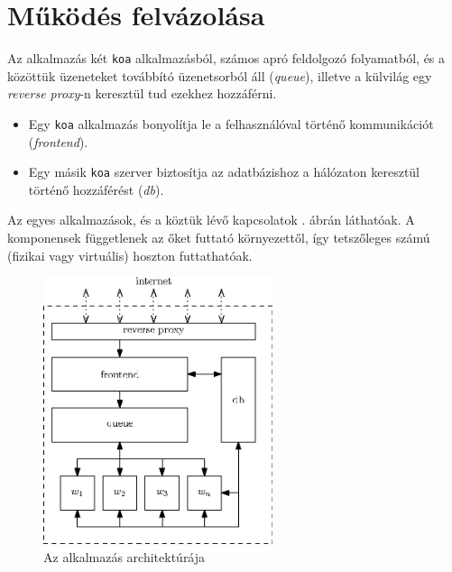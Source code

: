 \section{Működés felvázolása}

Az alkalmazás két \verb=koa= alkalmazásból, számos apró feldolgozó folyamatból,
és a közöttük üzeneteket továbbító üzenetsorból áll (\emph{queue}),
illetve a külvilág egy \emph{reverse proxy}-n keresztül tud ezekhez hozzáférni.


\begin{itemize}
  \item Egy \verb=koa= alkalmazás bonyolítja le a felhasználóval történő
    kommunikációt (\emph{frontend}).
  \item Egy másik \verb=koa= szerver biztosítja az adatbázishoz a hálózaton
    keresztül történő hozzáférést (\emph{db}).
\end{itemize}

Az egyes alkalmazások, és a köztük lévő kapcsolatok .
ábrán láthatóak. A komponensek függetlenek az őket futtató környezettől,
így tetszőleges számú (fizikai vagy virtuális) hoszton futtathatóak.

\begin{figure}[h!]
  \centering
  \includegraphics[width=0.6\textwidth]{figures/arch}
  \caption{Az alkalmazás architektúrája}
  \label{fig:arch}
\end{figure}
